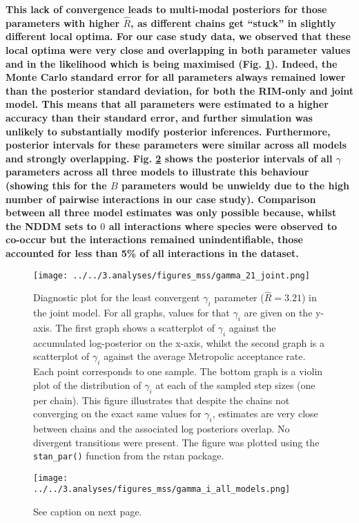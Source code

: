 \begin{refsection}
    \textbf{This lack of convergence leads to multi-modal posteriors for those parameters with higher $\hat{R}$, as different chains get ``stuck'' in slightly different local optima. For our case study data, we observed that these local optima were very close and overlapping in both parameter values and in the likelihood which is being maximised (Fig. \ref{fig:parexample}). Indeed, the Monte Carlo standard error for all parameters always remained lower than the posterior standard deviation, for both the RIM-only and joint model. This means that all parameters were estimated to a higher accuracy than their standard error, and further simulation was unlikely to substantially modify posterior inferences. Furthermore, posterior intervals for these parameters were similar across all models and strongly overlapping. Fig. \ref{fig:gamma_all} shows the posterior intervals of all $\gamma$ parameters across all three models to illustrate this behaviour (showing this for the $B$ parameters would be unwieldy due to the high number of pairwise interactions in our case study). Comparison between all three model estimates was only possible because, whilst the NDDM sets to $0$ all interactions where species were observed to co-occur but the interactions remained unindentifiable, those accounted for less than 5\% of all interactions in the dataset.}


    \begin{figure}[H]
        \texttt{[image: ../../3.analyses/figures\_mss/gamma\_21\_joint.png]}
        \caption{Diagnostic plot for the least convergent $\gamma_i$ parameter ($\hat{R} = 3.21$) in the joint model. For all graphs, values for that $\gamma_i$ are given on the y-axis. The first graph shows a scatterplot of $\gamma_i$ against the accumulated log-posterior on the x-axis, whilst the second graph is a scatterplot of $\gamma_i$ against the average Metropolic acceptance rate. Each point corresponds to one sample. The bottom graph is a violin plot of the distribution of $\gamma_i$ at each of the sampled step sizes (one per chain). This figure illustrates that despite the chains not converging on the exact same values for $\gamma_i$, estimates are very close between chains and the associated log posteriors overlap. No divergent transitions were present. The figure was plotted using the \texttt{stan\_par()} function from the rstan package.}
        \label{fig:parexample}
    \end{figure}

    \begin{figure}[H]
        \texttt{[image: ../../3.analyses/figures\_mss/gamma\_i\_all\_models.png]}
        \caption{See caption on next page.}
        \label{fig:gamma_all}
    \end{figure}


\end{refsection}
